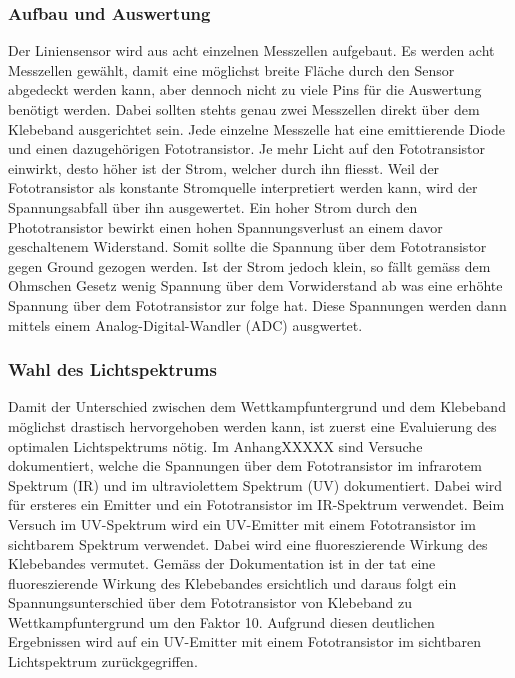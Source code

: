 \documentclass[main.tex]{subfiles} %
\begin{document}
\subsubsection{Aufbau und Auswertung}
Der Liniensensor wird aus acht einzelnen Messzellen aufgebaut. Es werden acht Messzellen
gewählt, damit eine möglichst breite Fläche durch den Sensor abgedeckt werden kann, aber
dennoch nicht zu viele Pins für die Auswertung benötigt werden. Dabei sollten stehts genau
zwei Messzellen direkt über dem Klebeband ausgerichtet sein. Jede einzelne Messzelle hat 
eine emittierende Diode und einen dazugehörigen Fototransistor. Je mehr Licht auf den 
Fototransistor einwirkt, desto höher ist der Strom, welcher durch ihn fliesst. Weil der 
Fototransistor als konstante Stromquelle interpretiert werden kann, wird der Spannungsabfall
über ihn ausgewertet. Ein hoher Strom durch den Phototransistor bewirkt einen hohen 
Spannungsverlust an einem davor geschaltenem Widerstand. Somit sollte die Spannung über dem
Fototransistor gegen Ground gezogen werden. Ist der Strom jedoch klein,
so fällt gemäss dem Ohmschen Gesetz wenig Spannung über dem Vorwiderstand ab was eine erhöhte
Spannung über dem Fototransistor zur folge hat. Diese Spannungen werden dann mittels einem
Analog-Digital-Wandler (ADC) ausgwertet.

\subsubsection{Wahl des Lichtspektrums}
Damit der Unterschied zwischen dem Wettkampfuntergrund und dem Klebeband möglichst 
drastisch hervorgehoben werden kann, ist zuerst eine Evaluierung des optimalen
Lichtspektrums nötig. Im AnhangXXXXX sind Versuche dokumentiert, welche die Spannungen 
über dem Fototransistor im infrarotem Spektrum (IR) und im ultraviolettem Spektrum (UV) 
dokumentiert. Dabei wird für ersteres ein Emitter und ein Fototransistor im IR-Spektrum
verwendet. Beim Versuch im UV-Spektrum wird ein UV-Emitter mit einem Fototransistor 
im sichtbarem Spektrum verwendet. Dabei wird eine fluoreszierende Wirkung des Klebebandes 
vermutet. Gemäss der Dokumentation ist in der tat eine fluoreszierende Wirkung des Klebebandes 
ersichtlich und daraus folgt ein Spannungsunterschied über dem Fototransistor von Klebeband 
zu Wettkampfuntergrund um den Faktor 10. Aufgrund diesen deutlichen Ergebnissen wird auf ein 
UV-Emitter mit einem Fototransistor im sichtbaren Lichtspektrum zurückgegriffen.
\end{document}
